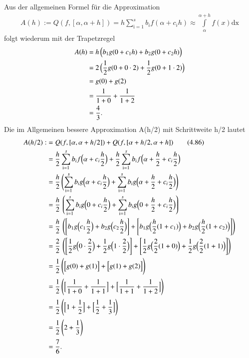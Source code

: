\documentclass[10pt,a4paper]{article}
\begin{document}
	
	Aus der allgemeinen Formel für die Approximation
	\begin{align*}\tag{4.85, S. 99}
		A(h):=Q(f,[\alpha,\alpha+h])=h\sum\limits_{\text{i}=1}^{s}b_if(\alpha+c_ih)\approx\int\limits_{\alpha}^{\alpha+h}f(x)\text{dx}
	\end{align*}
	folgt wiederum mit der Trapetzregel
	\begin{align*}
		A(h)&=h\,\Bigl( b_1g(0+c_1h) + b_2g(0+c_2h)\Bigr) \\
		&=2\,\Bigl( \frac{1}{2}g(0+0\cdot 2) + \frac{1}{2}g(0+1\cdot 2)\Bigr) \\
		&=g(0) + g(2) \\
		&=\frac{1}{1+0} + \frac{1}{1+2} \\
		&=\frac{4}{3}.
	\end{align*}
	Die im Allgemeinen bessere Approximation A(h/2) mit Schrittweite h/2 lautet
	\begin{align*}
		A(h/2):&=Q(f,[\alpha,\alpha+h/2])+Q(f,[\alpha+h/2,\alpha+h]) \tag{4.86} \\
		&=\frac{h}{2}\sum\limits_{\text{i}=1}^{s}b_if\Bigl(\alpha+c_i\frac{h}{2}\Bigr) + \frac{h}{2}\sum\limits_{\text{i}=1}^{s}b_if\Bigl(\alpha+\frac{h}{2}+c_i\frac{h}{2}\Bigr) \\
		&= \frac{h}{2}\,\Biggl(
				\sum\limits_{\text{i}=1}^{s}b_ig\Bigl(\alpha+c_i\frac{h}{2}\Bigr) + \sum\limits_{\text{i}=1}^{s}b_ig\Bigl(\alpha+\frac{h}{2}+c_i\frac{h}{2}\Bigr)
		   \Biggr) \\
		&= \frac{h}{2}\,\left(
			\sum\limits_{\text{i}=1}^{s}b_ig\Bigl(0+c_i\frac{h}{2}\Bigr) +  \sum\limits_{\text{i}=1}^{s}b_ig\Bigl(0+\frac{h}{2}+c_i\frac{h}{2}\Bigr)
		   \right) \\
		&= \frac{h}{2}\,\left(
			\left[b_1g\Bigl(c_1\frac{h}{2}\Bigr) + b_2g\Bigl(c_2\frac{h}{2}\Bigr) \right]+  	\left[b_1g\Bigl(\frac{h}{2}(1+c_1)\Bigr) +b_2g\Bigl(\frac{h}{2}(1+c_2)\Bigr) \right]
		   \right) \\
		&= \frac{2}{2}\,\left(
			\left[\frac{1}{2}g\Bigl(0\cdot\frac{2}{2}\Bigr) + \frac{1}{2}g\Bigl(1\cdot\frac{2}{2}\Bigr) \right]+\left[\frac{1}{2}g\Bigl(\frac{2}{2}(1+0)\Bigr) +\frac{1}{2}g\Bigl(\frac{2}{2}(1+1)\Bigr) \right]
		   \right) \\
		&= \frac{1}{2}\,\Biggl( \Bigl[g(0) + g(1)\Bigr] + \Bigl[g(1) + g(2)\Bigr] \Biggr) \\
		&= \frac{1}{2}\,\Biggl( \Bigl[\frac{1}{1+0} + \frac{1}{1+1}\Bigr] + \Bigl[\frac{1}{1+1} + \frac{1}{1+2}\Bigr] \Biggr) \\
		&= \frac{1}{2}\,\Biggl( \Bigl[1 + \frac{1}{2}\Bigr] + \Bigl[\frac{1}{2} + \frac{1}{3}\Bigr] \Biggr) \\
		&= \frac{1}{2}\,\Biggl(2 + \frac{1}{3} \Biggr) \\
		&= \frac{7}{6}.\\
	\end{align*}
\end{document}
